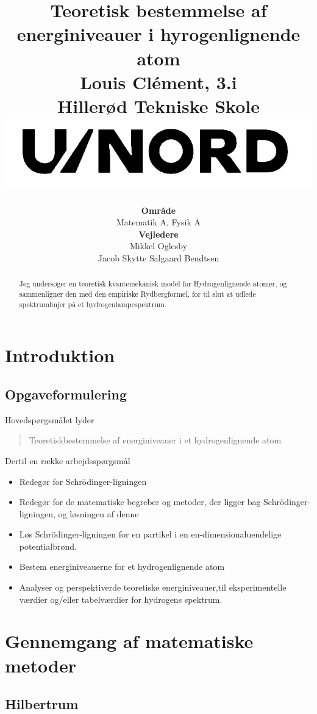 \documentclass[12pt]{article}
\title{
  {{Teoretisk bestemmelse af energiniveauer i hyrogenlignende atom}}\\
  {\large{Louis Clément, 3.i}}\\
  {\large Hillerød Tekniske Skole}\\
  \vspace{2cm}
  {\includegraphics[scale=1.5]{gym.png}}
  \vspace*{1.5cm}
}
\author{
  \begin{tabular}[!h]{c}
    \textbf{Område}\\
                Matematik A, Fysik A \\
    \textbf{Vejledere}\\
                 Mikkel Oglesby \\ Jacob Skytte Salgaard Bendtsen
  \end{tabular}
}
\date{\vspace*{1cm}{18. december 2020}}
\theoremstyle{definition}
\theoremstyle{remark}
\theoremstyle{definition}
\numberwithin{equation}{section}
\begin{document}
\maketitle
\newpage
\begin{abstract}
\noindent 
    Jeg undersøger en teoretisk kvantemekanisk model for Hydrogenlignende atomer, og sammenligner den med den empiriske Rydbergformel, for til slut at udlede spektrumlinjer på et hydrogenlampespektrum.
\end{abstract}

\tableofcontents

\newpage
\setcounter{page}{1}

\section{Introduktion}
\subsection{Opgaveformulering}
Hovedspørgsmålet lyder
\begin{quote}
    Teoretiskbestemmelse af energiniveauer i et hydrogenlignende atom
\end{quote}
Dertil en række arbejdsspørgsmål
\begin{itemize}
    \item Redegør for Schrödinger-ligningen
    \item Redegør for de matematiske begreber og metoder, der ligger bag Schrödinger-ligningen, og løsningen af denne
    \item Løs Schrödinger-ligningen for en partikel i en en-dimensionaluendelige potentialbrønd.
    \item Bestem energiniveauerne for et hydrogenlignende atom
    \item Analyser og perspektiverde teoretiske energiniveauer,til eksperimentelle værdier og/eller tabelværdier for hydrogens spektrum.
    \end{itemize}

\section{Gennemgang af matematiske metoder}
\subsection{Hilbertrum}
\end{document}
